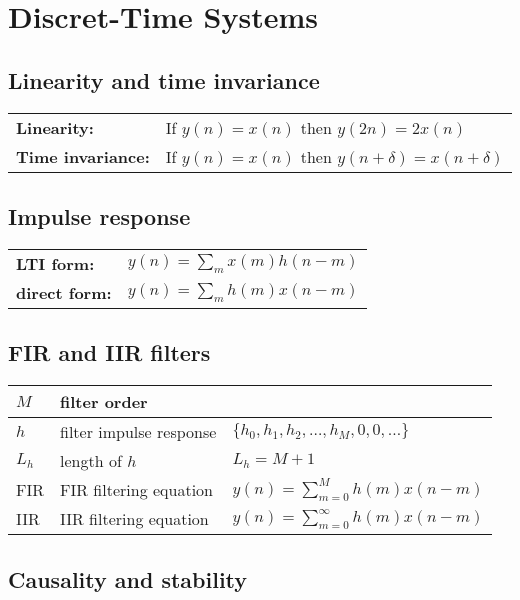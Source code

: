 \section{Discret-Time Systems}
\subsection{Linearity and time invariance}
\begin{tabular}{ll}
\textbf{Linearity:} & If $y(n) = x(n)$ then $y(2n)=2x(n)$\\
\textbf{Time invariance:} & If $y(n) = x(n)$ then $y(n+\delta) = x(n+\delta)$\\
\end{tabular}

\subsection{Impulse response}
\begin{tabular}{ll}
	\textbf{LTI form:}		& $y(n) = \sum\limits_m x(m)h(n-m)$ \\
	\textbf{direct form:}	& $y(n) = \sum\limits_m h(m)x(n-m)$
\end{tabular}


\subsection{FIR and IIR filters}
\begin{tabular}{|l|l|l|}
	\hline
	$M$	& filter order				& 
	\\ \hline
	$h$	& filter impulse response	& $\{ h_0, h_1, h_2, \ldots , h_M, 0, 0, \ldots\}$
	\\ \hline
	$L_h$	& length of $h$			& $L_h = M + 1$
	\\ \hline
	FIR		& FIR filtering equation	& $y(n) = \sum\limits_{m=0}^{M} h(m)x(n-m)$
	\\ \hline
	IIR		& IIR filtering equation	& $y(n) = \sum\limits_{m=0}^{\infty} h(m)x(n-m)$
	\\ \hline
\end{tabular}


\subsection{Causality and stability}
